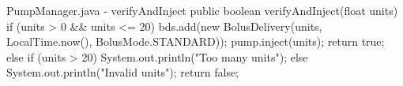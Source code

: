\begin{javaCode} {PumpManager.java - verifyAndInject}
public boolean verifyAndInject(float units) {
    if (units > 0 && units <= 20) {
        bds.add(new BolusDelivery(units, LocalTime.now(), BolusMode.STANDARD));
        pump.inject(units);
        return true;
    } else if (units > 20) {
        System.out.println("Too many units");
    } else {
        System.out.println("Invalid units");
    }
    return false;
}
\end{javaCode}